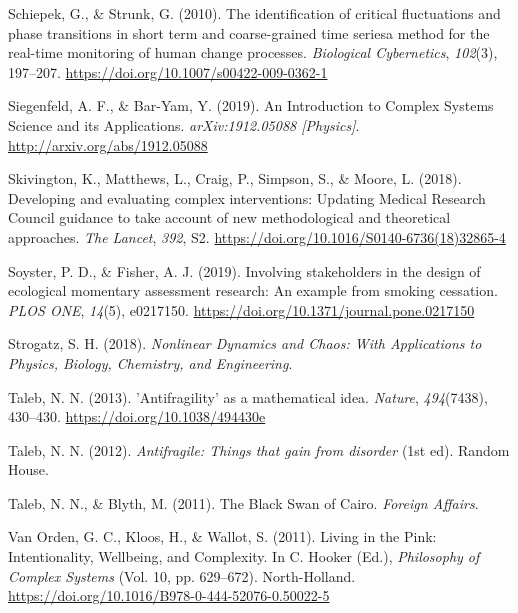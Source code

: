 \documentclass[
  british,
  man,floatsintext]{apa6}
\begin{document}
\leavevmode\hypertarget{ref-schiepekIdentificationCriticalFluctuations2010}{}%
Schiepek, G., \& Strunk, G. (2010). The identification of critical fluctuations and phase transitions in short term and coarse-grained time seriesa method for the real-time monitoring of human change processes. \emph{Biological Cybernetics}, \emph{102}(3), 197--207. \url{https://doi.org/10.1007/s00422-009-0362-1}

\leavevmode\hypertarget{ref-siegenfeldIntroductionComplexSystems2019}{}%
Siegenfeld, A. F., \& Bar-Yam, Y. (2019). An Introduction to Complex Systems Science and its Applications. \emph{arXiv:1912.05088 {[}Physics{]}}. \url{http://arxiv.org/abs/1912.05088}

\leavevmode\hypertarget{ref-skivingtonDevelopingEvaluatingComplex2018}{}%
Skivington, K., Matthews, L., Craig, P., Simpson, S., \& Moore, L. (2018). Developing and evaluating complex interventions: Updating Medical Research Council guidance to take account of new methodological and theoretical approaches. \emph{The Lancet}, \emph{392}, S2. \url{https://doi.org/10.1016/S0140-6736(18)32865-4}

\leavevmode\hypertarget{ref-soysterInvolvingStakeholdersDesign2019}{}%
Soyster, P. D., \& Fisher, A. J. (2019). Involving stakeholders in the design of ecological momentary assessment research: An example from smoking cessation. \emph{PLOS ONE}, \emph{14}(5), e0217150. \url{https://doi.org/10.1371/journal.pone.0217150}

\leavevmode\hypertarget{ref-strogatzNonlinearDynamicsChaos2018}{}%
Strogatz, S. H. (2018). \emph{Nonlinear Dynamics and Chaos: With Applications to Physics, Biology, Chemistry, and Engineering}.

\leavevmode\hypertarget{ref-talebAntifragilityMathematicalIdea2013}{}%
Taleb, N. N. (2013). 'Antifragility' as a mathematical idea. \emph{Nature}, \emph{494}(7438), 430--430. \url{https://doi.org/10.1038/494430e}

\leavevmode\hypertarget{ref-talebAntifragileThingsThat2012}{}%
Taleb, N. N. (2012). \emph{Antifragile: Things that gain from disorder} (1st ed). Random House.

\leavevmode\hypertarget{ref-talebBlackSwanCairo2011}{}%
Taleb, N. N., \& Blyth, M. (2011). The Black Swan of Cairo. \emph{Foreign Affairs}.

\leavevmode\hypertarget{ref-vanordenLivingPinkIntentionality2011}{}%
Van Orden, G. C., Kloos, H., \& Wallot, S. (2011). Living in the Pink: Intentionality, Wellbeing, and Complexity. In C. Hooker (Ed.), \emph{Philosophy of Complex Systems} (Vol. 10, pp. 629--672). North-Holland. \url{https://doi.org/10.1016/B978-0-444-52076-0.50022-5}
\end{document}
